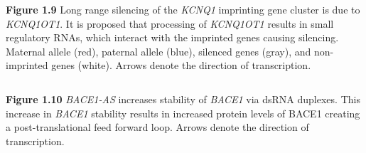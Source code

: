 \documentclass{beamer}
\begin{document}
\begin{frame}
  \begin{columns}
    
    \begin{block}{\textbf{Figure 1.9}}
      Long range silencing of the \emph{KCNQ1} imprinting gene cluster is due to \emph{KCNQ1OT1}. It is proposed that processing of \emph{KCNQ1OT1} results in small regulatory RNAs, which interact with the imprinted genes causing silencing. Maternal allele (red), paternal allele (blue), silenced genes (gray), and non-imprinted genes (white). Arrows denote the direction of transcription.
    \end{block}
  \end{columns}
  
\end{frame}

\begin{frame}
  \begin{block}{\textbf{Figure 1.10}}
    \emph{BACE1-AS} increases stability of \emph{BACE1} via dsRNA duplexes. This increase in \emph{BACE1} stability results in increased protein levels of BACE1 creating a post-translational feed forward loop. Arrows denote the direction of transcription.
  \end{block}
\end{frame}
\end{document}
